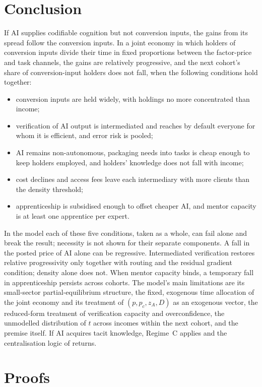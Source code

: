 \documentclass[12pt]{article}
\theoremstyle{remark}
\begin{document}
\section{Conclusion}\label{sec:conclusion}

If AI supplies codifiable cognition but not conversion inputs, the gains from its spread follow the conversion inputs. In a joint economy in which holders of conversion inputs divide their time in fixed proportions between the factor-price and task channels, the gains are relatively progressive, and the next cohort's share of conversion-input holders does not fall, when the following conditions hold together:
\begin{itemize}[itemsep=0pt]
\item conversion inputs are held widely, with holdings no more concentrated than income;
\item verification of AI output is intermediated and reaches by default everyone for whom it is efficient, and error risk is pooled;
\item AI remains non-autonomous, packaging needs into tasks is cheap enough to keep holders employed, and holders' knowledge does not fall with income;
\item cost declines and access fees leave each intermediary with more clients than the density threshold;
\item apprenticeship is subsidised enough to offset cheaper AI, and mentor capacity is at least one apprentice per expert.
\end{itemize}
In the model each of these five conditions, taken as a whole, can fail alone and break the result; necessity is not shown for their separate components. A fall in the posted price of AI alone can be regressive. Intermediated verification restores relative progressivity only together with routing and the residual gradient condition; density alone does not. When mentor capacity binds, a temporary fall in apprenticeship persists across cohorts. The model's main limitations are its small-sector partial-equilibrium structure, the fixed, exogenous time allocation of the joint economy and its treatment of $(p,p_c,z_A,D)$ as an exogenous vector, the reduced-form treatment of verification capacity and overconfidence, the unmodelled distribution of $t$ across incomes within the next cohort, and the premise itself. If AI acquires tacit knowledge, Regime~C applies and the centralisation logic of \citet{brynjolfsson2026hayek} returns.

\appendix
\sloppy
\section{Proofs}\label{app:proofs}
\end{document}
